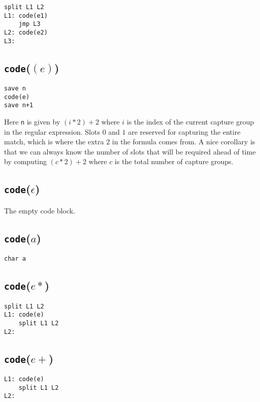 \begin{verbatim}
split L1 L2
L1: code(e1)
    jmp L3
L2: code(e2)
L3:
\end{verbatim}

\subsection{{\tt code}($(e)$)}

\begin{verbatim}
save n
code(e)
save n+1
\end{verbatim}

Here \verb'n' is given by $(i*2) + 2$ where $i$ is the index of
the current capture group in the regular expression. Slots $0$
and $1$ are reserved for capturing the entire match, which is
where the extra $2$ in the formula comes from. A nice corollary
is that we can always know the number of slots that
will be required ahead of time by computing $(c*2) + 2$
where $c$ is the total number of capture groups.

\subsection{{\tt code}($\epsilon$)}

The empty code block.

\subsection{{\tt code}($a$)}

\begin{verbatim}
char a
\end{verbatim}

\subsection{{\tt code}($e*$)}

\begin{verbatim}
split L1 L2
L1: code(e)
    split L1 L2
L2: 
\end{verbatim}

\subsection{{\tt code}($e+$)}

\begin{verbatim}
L1: code(e)
    split L1 L2
L2: 
\end{verbatim}

